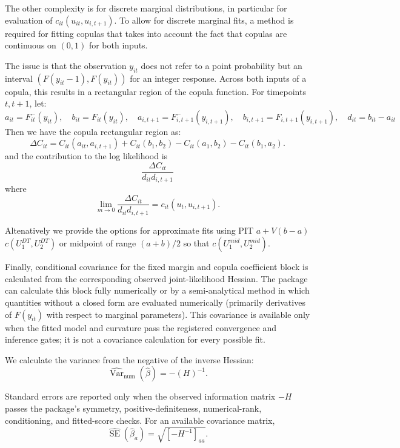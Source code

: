 \documentclass{article}
\begin{document}
The other complexity is for discrete marginal distributions, in particular for evaluation of $c_{it}(u_{it},u_{i,t+1})$. To allow for discrete marginal fits, a method is required for fitting copulas that takes into account the fact that copulas are continuous on $(0,1)$ for both inputs.

The issue is that the observation $y_{it}$ does not refer to a point probability but an interval $(F(y_{it}-1),F(y_{it}))$ for an integer response. Across both inputs of a copula, this results in a rectangular region of the copula function. For timepoints $t,t+1$, let:
\[
  a_{it} = F_{it}^{-}(y_{it}), \quad
  b_{it} = F_{it}(y_{it}), \quad
  a_{i,t+1} = F_{i,t+1}^{-}(y_{i,t+1}), \quad
  b_{i,t+1} = F_{i,t+1}(y_{i,t+1}), \quad
  d_{it}=b_{it}-a_{it}
\]
Then we have the copula rectangular region as:
\[
  \Delta C_{it}=C_{it}(a_{it},a_{i,t+1})
  +
  C_{it}(b_1,b_2)
  -
  C_{it}(a_1,b_2)
  -
  C_{it}(b_1,a_2)
  .
\]
and the contribution to the log likelihood is
\[\frac{
  \Delta C_{it}}{d_{it}d_{i,t+1}}
\]
where
\[ \lim_{m\to 0} \frac{
  \Delta C_{it}}{d_{it}d_{i,t+1}} =c_{it}(u_t,u_{i,t+1}).
\]

Altenatively we provide the options for approximate fits using PIT \(a + V(b-a)\)  \(c(U_1^{DT},U_2^{DT})\) or midpoint of range \((a+b)/2\) so that \(c(U_1^{mid},U_2^{mid})\).

Finally, conditional covariance for the fixed margin and copula coefficient
block is calculated from the corresponding observed joint-likelihood Hessian.
The package can calculate this block fully numerically or by a semi-analytical
method in which quantities without a closed form are evaluated numerically
(primarily derivatives of $F(y_{it})$ with respect to marginal parameters).
This covariance is available only when the fitted model and curvature pass the
registered convergence and inference gates; it is not a covariance calculation
for every possible fit.

We calculate the variance from the negative of the inverse Hessian:
\begin{equation*}
\widehat{\operatorname{Var}}_{\text{num}}(\hat{\beta}) = -\left(H\right)^{-1}.
\end{equation*}

Standard errors are reported only when the observed information matrix
$-H$ passes the package's symmetry, positive-definiteness, numerical-rank,
conditioning, and fitted-score checks. For an available covariance matrix,
\begin{equation*}
\widehat{\operatorname{SE}}(\hat{\beta}_a) =
\sqrt{\left[-H^{-1}\right]_{aa}}.
\end{equation*}
\end{document}
